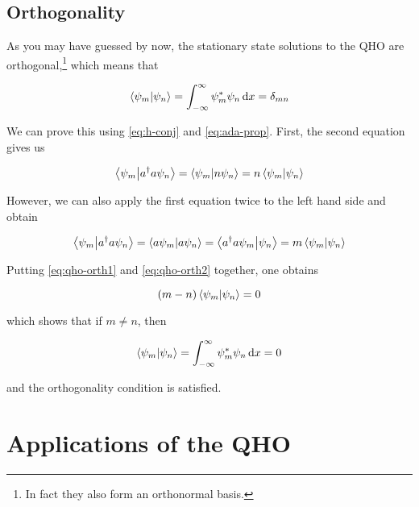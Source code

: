\subsection{Orthogonality}
As you may have guessed by now, the stationary state solutions to the QHO are orthogonal,\footnote{In fact they also form an orthonormal basis.} which means that 

\begin{equation}
	\braket{\psi_m}{\psi_n} = \int_{-\infty}^{\infty} \psi_m^*\psi_n \dd{x} = \delta_{mn} \label{eq:ortho_qho}
\end{equation}

We can prove this using \autoref{eq:h-conj} and \ref{eq:ada-prop}. 
First, the second equation gives us

\begin{equation}
	\braket{\psi_m}{a^{\dagger} a \psi_n} = \braket{\psi_m}{n\psi_n} = n\braket{\psi_m}{\psi_n} \label{eq:qho-orth1}
\end{equation}

However, we can also apply the first equation twice to the left hand side and obtain

\begin{equation}
	\braket{\psi_m}{a^{\dagger} a \psi_n} = \braket{a \psi_m}{a \psi_n} = \braket{a^{\dagger} a \psi_m}{\psi_n} = m\braket{\psi_m}{\psi_n} \label{eq:qho-orth2}
\end{equation}

Putting \autoref{eq:qho-orth1} and \ref{eq:qho-orth2} together, one obtains

\begin{equation*}
	(m-n)\braket{\psi_m}{\psi_n} = 0
\end{equation*}

\noindent which shows that if $m \neq n$, then 

\begin{equation*}
	\braket{\psi_m}{\psi_n} = \int_{-\infty}^{\infty} \psi_m^*\psi_n \dd{x} = 0
\end{equation*}

\noindent and the orthogonality condition is satisfied. 


\section[Applications]{Applications of the QHO}

